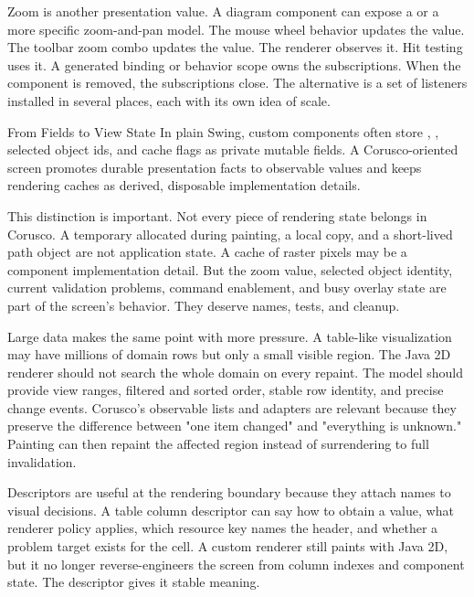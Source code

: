 Zoom is another presentation value. A diagram component can expose a  or a more specific zoom-and-pan model. The mouse wheel behavior updates the value. The toolbar zoom combo updates the value. The renderer observes it. Hit testing uses it. A generated binding or behavior scope owns the subscriptions. When the component is removed, the subscriptions close. The alternative is a set of listeners installed in several places, each with its own idea of scale.

\begin{migrationbox}{From Fields to View State}
In plain Swing, custom components often store , , selected object ids, and cache flags as private mutable fields. A Corusco-oriented screen promotes durable presentation facts to observable values and keeps rendering caches as derived, disposable implementation details.
\end{migrationbox}

This distinction is important. Not every piece of rendering state belongs in Corusco. A temporary  allocated during painting, a local  copy, and a short-lived path object are not application state. A cache of raster pixels may be a component implementation detail. But the zoom value, selected object identity, current validation problems, command enablement, and busy overlay state are part of the screen's behavior. They deserve names, tests, and cleanup.

Large data makes the same point with more pressure. A table-like visualization may have millions of domain rows but only a small visible region. The Java 2D renderer should not search the whole domain on every repaint. The model should provide view ranges, filtered and sorted order, stable row identity, and precise change events. Corusco's observable lists and adapters are relevant because they preserve the difference between "one item changed" and "everything is unknown." Painting can then repaint the affected region instead of surrendering to full invalidation.

Descriptors are useful at the rendering boundary because they attach names to visual decisions. A table column descriptor can say how to obtain a value, what renderer policy applies, which resource key names the header, and whether a problem target exists for the cell. A custom renderer still paints with Java 2D, but it no longer reverse-engineers the screen from column indexes and component state. The descriptor gives it stable meaning.

